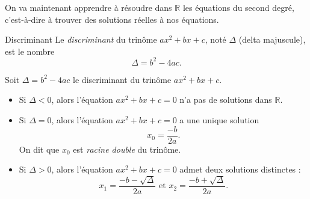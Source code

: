 \documentclass[11pt]{article}
\begin{document}
On va maintenant apprendre à résoudre dans $\mathbb{R}$ les équations du second
degré, c'est-à-dire à trouver des solutions réelles à nos équations.

\begin{defi}{Discriminant}
  Le \emph{discriminant} du trinôme $ax^2+bx+c$, noté $\Delta$ (delta
  majuscule), est le nombre
  \[
    \Delta = b^2-4ac.
  \]
\end{defi}

\begin{prop}
  Soit $\Delta=b^2-4ac$ le discriminant du trinôme $ax^2+bx+c$.
  \begin{itemize}
    \item Si $\Delta<0$, alors l'équation $ax^2+bx+c=0$ n'a pas de solutions
      dans $\mathbb{R}$.
    \item Si $\Delta=0$, alors l'équation $ax^2+bx+c=0$ a une unique solution
      \[x_0 = \frac{-b}{2a}.\] On dit que $x_0$ est \emph{racine double} du trinôme.
    \item Si $\Delta>0$, alors l'équation $ax^2+bx+c=0$ admet deux solutions
      distinctes : 
      \[
        x_1=\frac{-b-\sqrt\Delta}{2a}
        \text{ et }
        x_2=\frac{-b+\sqrt\Delta}{2a}.
      \]
  \end{itemize}
\end{prop}
\end{document}
